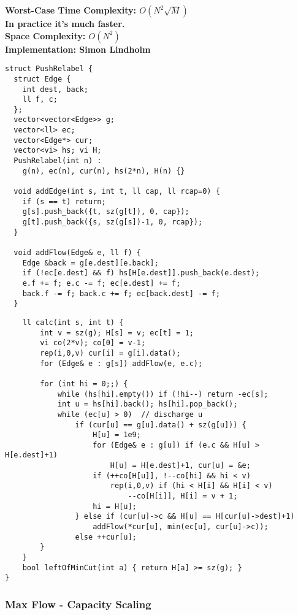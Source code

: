 \textbf{Worst-Case Time Complexity: $O(N^2\sqrt{M})$}\\
\textbf{In practice it's much faster.}\\
\textbf{Space Complexity: $O(N^2)$}\\
\textbf{Implementation: Simon Lindholm}
\begin{center}
\begin{minipage}[t]{0.45\linewidth}
\begin{lstlisting}
struct PushRelabel {
  struct Edge {
    int dest, back;
    ll f, c;
  };
  vector<vector<Edge>> g;
  vector<ll> ec;
  vector<Edge*> cur;
  vector<vi> hs; vi H;
  PushRelabel(int n) :
    g(n), ec(n), cur(n), hs(2*n), H(n) {}

  void addEdge(int s, int t, ll cap, ll rcap=0) {
    if (s == t) return;
    g[s].push_back({t, sz(g[t]), 0, cap});
    g[t].push_back({s, sz(g[s])-1, 0, rcap});
  }

  void addFlow(Edge& e, ll f) {
    Edge &back = g[e.dest][e.back];
    if (!ec[e.dest] && f) hs[H[e.dest]].push_back(e.dest);
    e.f += f; e.c -= f; ec[e.dest] += f;
    back.f -= f; back.c += f; ec[back.dest] -= f;
  }
\end{lstlisting}
\end{minipage}
\qquad
\begin{minipage}[t]{0.45\linewidth}
\begin{lstlisting}
	ll calc(int s, int t) {
		int v = sz(g); H[s] = v; ec[t] = 1;
		vi co(2*v); co[0] = v-1;
		rep(i,0,v) cur[i] = g[i].data();
		for (Edge& e : g[s]) addFlow(e, e.c);

		for (int hi = 0;;) {
			while (hs[hi].empty()) if (!hi--) return -ec[s];
			int u = hs[hi].back(); hs[hi].pop_back();
			while (ec[u] > 0)  // discharge u
				if (cur[u] == g[u].data() + sz(g[u])) {
					H[u] = 1e9;
					for (Edge& e : g[u]) if (e.c && H[u] > H[e.dest]+1)
						H[u] = H[e.dest]+1, cur[u] = &e;
					if (++co[H[u]], !--co[hi] && hi < v)
						rep(i,0,v) if (hi < H[i] && H[i] < v)
							--co[H[i]], H[i] = v + 1;
					hi = H[u];
				} else if (cur[u]->c && H[u] == H[cur[u]->dest]+1)
					addFlow(*cur[u], min(ec[u], cur[u]->c));
				else ++cur[u];
		}
	}
	bool leftOfMinCut(int a) { return H[a] >= sz(g); }
}
\end{lstlisting}
\end{minipage}
\end{center}

\newpage

\subsubsection{Max Flow - Capacity Scaling}
